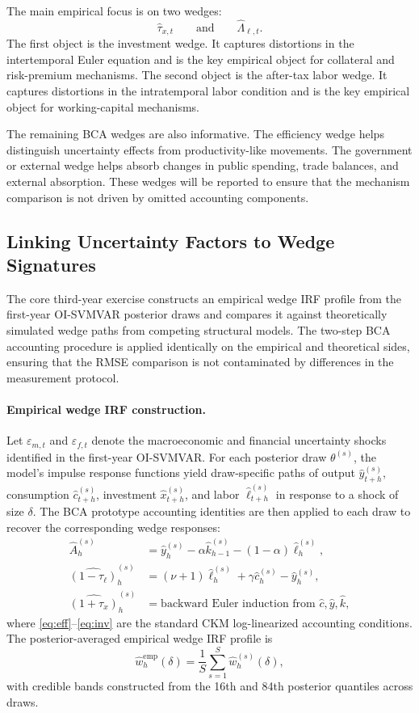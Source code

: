 \documentclass[12pt]{article}
\begin{document}
The main empirical focus is on two wedges:
\[
\hat{\tau}_{x,t}
\qquad \text{and} \qquad
\hat{\Lambda}_{\ell,t}.
\]
The first object is the investment wedge. It captures distortions in the intertemporal Euler
equation and is the key empirical object for collateral and risk-premium mechanisms. The second
object is the after-tax labor wedge. It captures distortions in the intratemporal labor condition
and is the key empirical object for working-capital mechanisms.

The remaining BCA wedges are also informative. The efficiency wedge helps distinguish uncertainty
effects from productivity-like movements. The government or external wedge helps absorb changes
in public spending, trade balances, and external absorption. These wedges will be reported to
ensure that the mechanism comparison is not driven by omitted accounting components.

\subsection{Linking Uncertainty Factors to Wedge Signatures}

The core third-year exercise constructs an empirical wedge IRF profile from the first-year
OI-SVMVAR posterior draws and compares it against theoretically simulated wedge paths from
competing structural models. The two-step BCA accounting procedure is applied identically on
the empirical and theoretical sides, ensuring that the RMSE comparison is not contaminated by
differences in the measurement protocol.

\paragraph{Empirical wedge IRF construction.}
Let $\varepsilon_{m,t}$ and $\varepsilon_{f,t}$ denote the macroeconomic and financial
uncertainty shocks identified in the first-year OI-SVMVAR. For each posterior draw
$\theta^{(s)}$, the model's impulse response functions yield draw-specific paths of output
$\hat{y}_{t+h}^{(s)}$, consumption $\hat{c}_{t+h}^{(s)}$, investment $\hat{x}_{t+h}^{(s)}$,
and labor $\hat{\ell}_{t+h}^{(s)}$ in response to a shock of size $\delta$. The BCA prototype
accounting identities are then applied to each draw to recover the corresponding wedge
responses:
\begin{align}
\hat{A}_{h}^{(s)} &= \hat{y}_{h}^{(s)} - \alpha\hat{k}_{h-1}^{(s)} - (1-\alpha)\hat{\ell}_{h}^{(s)}, \label{eq:eff}\\
\widehat{(1-\tau_{\ell})}_{h}^{(s)} &= (\nu+1)\hat{\ell}_{h}^{(s)} + \gamma\hat{c}_{h}^{(s)} - \hat{y}_{h}^{(s)}, \label{eq:lab}\\
\widehat{(1+\tau_{x})}_{h}^{(s)} &= \text{backward Euler induction from }\hat{c},\hat{y},\hat{k}, \label{eq:inv}
\end{align}
where \eqref{eq:eff}--\eqref{eq:inv} are the standard CKM log-linearized accounting
conditions. The posterior-averaged empirical wedge IRF profile is
\[
\hat{w}_{h}^{\mathrm{emp}}(\delta)
=
\frac{1}{S}\sum_{s=1}^{S}\hat{w}_{h}^{(s)}(\delta),
\]
with credible bands constructed from the 16th and 84th posterior quantiles across draws.
\end{document}
